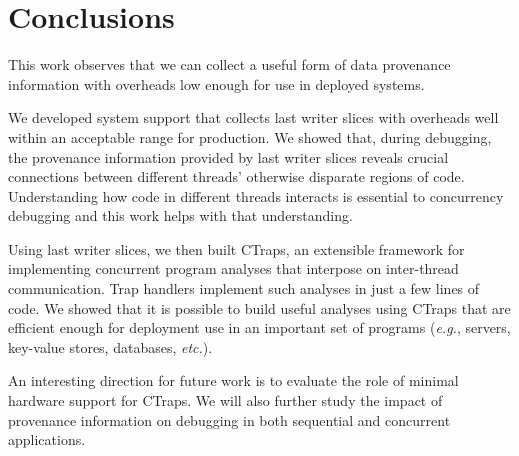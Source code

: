 \documentclass[preprint,9pt]{sigplanconf}
\newcommand{\ctraps}{CTraps\xspace}
\begin{document}
\section{Conclusions}
This work observes that we can collect a useful form of data provenance
information with overheads low enough for use in deployed systems. 

We developed system support that collects last writer slices with overheads
well within an acceptable range for production.  We showed that, during
debugging, the provenance information provided by last writer slices reveals
crucial connections between different threads' otherwise disparate regions of
code.  Understanding how code in different threads interacts is essential to
concurrency debugging and this work helps with that understanding.

Using last writer slices, we then built \ctraps, an extensible framework for
implementing concurrent program analyses that interpose on inter-thread
communication.  Trap handlers implement such analyses in just a few lines of
code.  We showed that it is possible to build useful analyses using \ctraps
that are efficient enough for deployment use in an important set of programs
({\em e.g.}, servers, key-value stores, databases, {\em etc.}).  


An interesting direction for future work is to evaluate the role of minimal
hardware support for \ctraps.  We will also further study the impact of
provenance information on debugging in both sequential and concurrent
applications. 




{}

\end{document}
